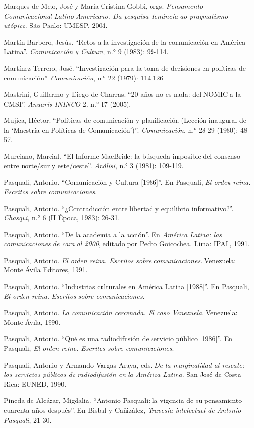 \documentclass{tufte-handout}
\begin{document}
\begin{hangparas}{.25in}{1}
Marques de Melo, José y Maria Cristina Gobbi, orgs. \emph{Pensamento
Comunicacional Latino-Americano. Da pesquisa denúncia ao pragmatismo
utópico}. São Paulo: UMESP, 2004.

Martín-Barbero, Jesús. ``Retos a la investigación de la comunicación en
América Latina''. \emph{Comunicación y Cultura}, n.° 9 (1983): 99-114.

Martínez Terrero, José. ``Investigación para la toma de decisiones en
políticas de comunicación''. \emph{Comunicación}, n.° 22 (1979):
114-126.

Mastrini, Guillermo y Diego de Charras. ``20 años no es nada: del NOMIC
a la CMSI''. \emph{Anuario ININCO} 2, n.° 17 (2005).

Mujica, Héctor. ``Políticas de comunicación y planificación (Lección
inaugural de la `Maestría en Políticas de Comunicación')''.
\emph{Comunicación}, n.° 28-29 (1980): 48-57.

Murciano, Marcial. ``El Informe MacBride: la búsqueda imposible del
consenso entre norte/sur y este/oeste''. \emph{Anàlisi}, n.° 3 (1981):
109-119.

Pasquali, Antonio. ``Comunicación y Cultura {[}1986{]}''. En Pasquali,
\emph{El orden reina. Escritos sobre comunicaciones}.

Pasquali, Antonio. ``¿Contradicción entre libertad y equilibrio
informativo?''. \emph{Chasqui}, n.° 6 (II Época, 1983): 26-31.

Pasquali, Antonio. ``De la academia a la acción''. En \emph{América
Latina: las comunicaciones de cara al 2000}, editado por Pedro
Goicochea. Lima: IPAL, 1991.

Pasquali, Antonio. \emph{El orden reina. Escritos sobre comunicaciones}.
Venezuela: Monte Ávila Editores, 1991.

Pasquali, Antonio. ``Industrias culturales en América Latina
{[}1988{]}''. En Pasquali, \emph{El orden reina. Escritos sobre
comunicaciones}.

Pasquali, Antonio. \emph{La comunicación cercenada. El caso Venezuela}.
Venezuela: Monte Ávila, 1990.

Pasquali, Antonio. ``Qué es una radiodifusión de servicio público
{[}1986{]}''. En Pasquali, \emph{El orden reina. Escritos sobre
comunicaciones}.

Pasquali, Antonio y Armando Vargas Araya, eds. \emph{De la marginalidad
al rescate: los servicios públicos de radiodifusión en la América
Latina}. San José de Costa Rica: EUNED, 1990.

Pineda de Alcázar, Migdalia. ``Antonio Pasquali: la vigencia de su
pensamiento cuarenta años después''. En Bisbal y Cañizález,
\emph{Travesía intelectual de Antonio Pasquali}, 21-30.


\end{hangparas}
\end{document}

